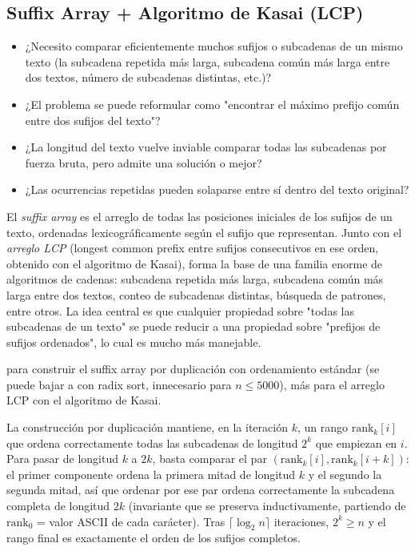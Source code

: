 \subsection{Suffix Array + Algoritmo de Kasai (LCP)}


\begin{itemize}
\item ¿Necesito comparar eficientemente muchos sufijos o subcadenas de un mismo texto (la subcadena repetida más larga, subcadena común más larga entre dos textos, número de subcadenas distintas, etc.)?
\item ¿El problema se puede reformular como "encontrar el máximo prefijo común entre dos sufijos del texto"?
\item ¿La longitud del texto vuelve inviable comparar todas las subcadenas por fuerza bruta, pero admite una solución  o mejor?
\item ¿Las ocurrencias repetidas pueden solaparse entre sí dentro del texto original?
\end{itemize}

 El \emph{suffix array} es el arreglo de todas las posiciones iniciales de los sufijos de un texto, ordenadas lexicográficamente según el sufijo que representan. Junto con el \emph{arreglo LCP} (longest common prefix entre sufijos consecutivos en ese orden, obtenido con el algoritmo de Kasai), forma la base de una familia enorme de algoritmos de cadenas: subcadena repetida más larga, subcadena común más larga entre dos textos, conteo de subcadenas distintas, búsqueda de patrones, entre otros. La idea central es que cualquier propiedad sobre "todas las subcadenas de un texto" se puede reducir a una propiedad sobre "prefijos de sufijos ordenados", lo cual es mucho más manejable.

  para construir el suffix array por duplicación con ordenamiento estándar (se puede bajar a  con radix sort, innecesario para \(n \le 5000\)), más  para el arreglo LCP con el algoritmo de Kasai.

 La construcción por duplicación mantiene, en la iteración $k$, un rango $\mathrm{rank}_k[i]$ que ordena correctamente todas las subcadenas de longitud $2^k$ que empiezan en $i$. Para pasar de longitud $k$ a $2k$, basta comparar el par $(\mathrm{rank}_k[i], \mathrm{rank}_k[i+k])$: el primer componente ordena la primera mitad de longitud $k$ y el segundo la segunda mitad, así que ordenar por ese par ordena correctamente la subcadena completa de longitud $2k$ (invariante que se preserva inductivamente, partiendo de $\mathrm{rank}_0$ = valor ASCII de cada carácter). Tras $\lceil \log_2 n \rceil$ iteraciones, $2^k \ge n$ y el rango final es exactamente el orden de los sufijos completos.

